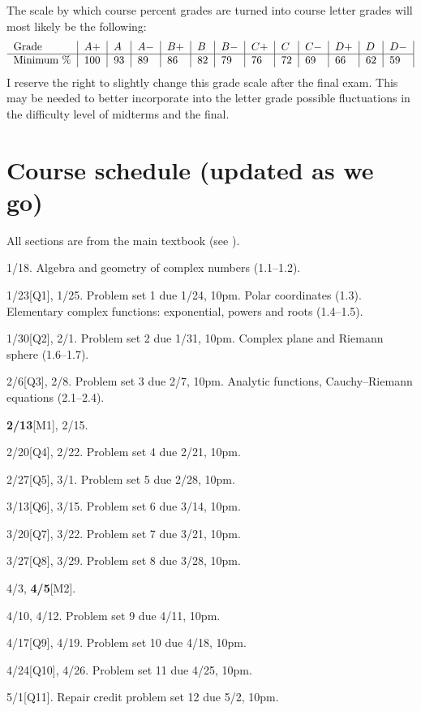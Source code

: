 \documentclass[oneside,11pt]{amsart}
\begin{document}
The scale by which course percent grades are turned into course letter grades
will most likely be the following:
\begin{equation*}
	\begin{tabular}{l|l|l|l|l|l|l|l|l|l|l|l|l|}
		Grade      & $ A+	$ & $A	$ & $A-	$ & $B+	$ & $B	$ & $B-	$ & $C+	$ & $C	$ & $C-	$ & $D+	$ & $D	$ & $D-$ \\
		\hline
		Minimum \% & 100     & 93   & 89    & 86    & 82    & 79    & 76    & 72    & 69    & 66    & 62    & 59
	\end{tabular}
\end{equation*}
I reserve the right to slightly change this grade scale after the
final exam.
This may be needed
to better incorporate into the letter grade
possible fluctuations in the difficulty level of 
midterms and the final.

\section{Course schedule (updated as we go)}
\label{sec:schedule}

All sections are from the main textbook (see ).

\medskip
\begin{enumerate}[\bf{}{[}week 1{]}]
	\item 1/18. Algebra and geometry of complex numbers (1.1--1.2).
	\item 1/23[Q1], 1/25. Problem set 1 due 1/24, 10pm.
		Polar coordinates (1.3). Elementary complex functions: exponential, powers and roots (1.4--1.5).
	\item 1/30[Q2], 2/1. Problem set 2 due 1/31, 10pm.
		Complex plane and Riemann sphere (1.6--1.7).
	\item 2/6[Q3], 2/8. Problem set 3 due 2/7, 10pm.
		Analytic functions, Cauchy--Riemann equations (2.1--2.4).
	\item \textbf{2/13}[M1], 2/15.
	\item 2/20[Q4], 2/22. Problem set 4 due 2/21, 10pm.
	\item 2/27[Q5], 3/1. Problem set 5 due 2/28, 10pm.
	\item 3/13[Q6], 3/15. Problem set 6 due 3/14, 10pm.
	\item 3/20[Q7], 3/22. Problem set 7 due 3/21, 10pm.
	\item 3/27[Q8], 3/29. Problem set 8 due 3/28, 10pm.
	\item 4/3, \textbf{4/5}[M2].
	\item 4/10, 4/12. Problem set 9 due 4/11, 10pm.
	\item 4/17[Q9], 4/19. Problem set 10 due 4/18, 10pm.
	\item 4/24[Q10], 4/26. Problem set 11 due 4/25, 10pm.
	\item 5/1[Q11]. Repair credit problem set 12 due 5/2, 10pm.
\end{enumerate}
\end{document}
